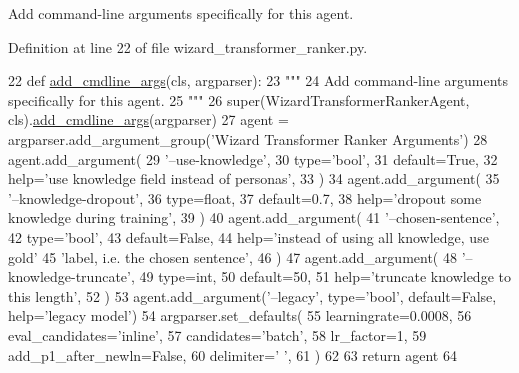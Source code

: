 \begin{DoxyVerb}Add command-line arguments specifically for this agent.
\end{DoxyVerb}
 

Definition at line 22 of file wizard\+\_\+transformer\+\_\+ranker.\+py.


\begin{DoxyCode}
22     \textcolor{keyword}{def }\hyperlink{namespaceparlai_1_1agents_1_1drqa_1_1config_a62fdd5554f1da6be0cba185271058320}{add\_cmdline\_args}(cls, argparser):
23         \textcolor{stringliteral}{"""}
24 \textcolor{stringliteral}{        Add command-line arguments specifically for this agent.}
25 \textcolor{stringliteral}{        """}
26         super(WizardTransformerRankerAgent, cls).\hyperlink{namespaceparlai_1_1agents_1_1drqa_1_1config_a62fdd5554f1da6be0cba185271058320}{add\_cmdline\_args}(argparser)
27         agent = argparser.add\_argument\_group(\textcolor{stringliteral}{'Wizard Transformer Ranker Arguments'})
28         agent.add\_argument(
29             \textcolor{stringliteral}{'--use-knowledge'},
30             type=\textcolor{stringliteral}{'bool'},
31             default=\textcolor{keyword}{True},
32             help=\textcolor{stringliteral}{'use knowledge field instead of personas'},
33         )
34         agent.add\_argument(
35             \textcolor{stringliteral}{'--knowledge-dropout'},
36             type=float,
37             default=0.7,
38             help=\textcolor{stringliteral}{'dropout some knowledge during training'},
39         )
40         agent.add\_argument(
41             \textcolor{stringliteral}{'--chosen-sentence'},
42             type=\textcolor{stringliteral}{'bool'},
43             default=\textcolor{keyword}{False},
44             help=\textcolor{stringliteral}{'instead of using all knowledge, use gold'}
45             \textcolor{stringliteral}{'label, i.e. the chosen sentence'},
46         )
47         agent.add\_argument(
48             \textcolor{stringliteral}{'--knowledge-truncate'},
49             type=int,
50             default=50,
51             help=\textcolor{stringliteral}{'truncate knowledge to this length'},
52         )
53         agent.add\_argument(\textcolor{stringliteral}{'--legacy'}, type=\textcolor{stringliteral}{'bool'}, default=\textcolor{keyword}{False}, help=\textcolor{stringliteral}{'legacy model'})
54         argparser.set\_defaults(
55             learningrate=0.0008,
56             eval\_candidates=\textcolor{stringliteral}{'inline'},
57             candidates=\textcolor{stringliteral}{'batch'},
58             lr\_factor=1,
59             add\_p1\_after\_newln=\textcolor{keyword}{False},
60             delimiter=\textcolor{stringliteral}{' '},
61         )
62 
63         \textcolor{keywordflow}{return} agent
64 
\end{DoxyCode}
